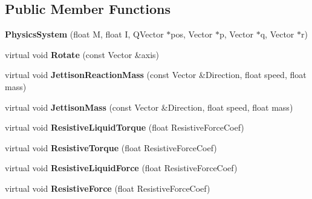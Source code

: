 \subsection*{Public Member Functions}
\begin{DoxyCompactItemize}
\item 
{\bfseries Physics\+System} (float M, float I, Q\+Vector $\ast$pos, Vector $\ast$p, Vector $\ast$q, Vector $\ast$r)\hypertarget{classPhysicsSystem_a30fd3a9343a9bd9a004bcd3f9c8bfa40}{}\label{classPhysicsSystem_a30fd3a9343a9bd9a004bcd3f9c8bfa40}

\item 
virtual void {\bfseries Rotate} (const Vector \&axis)\hypertarget{classPhysicsSystem_aeb8fb2743397f3682b459f891a4d7d2c}{}\label{classPhysicsSystem_aeb8fb2743397f3682b459f891a4d7d2c}

\item 
virtual void {\bfseries Jettison\+Reaction\+Mass} (const Vector \&Direction, float speed, float mass)\hypertarget{classPhysicsSystem_ac5a9beb8c8d90f8fc06585cdcaebd63b}{}\label{classPhysicsSystem_ac5a9beb8c8d90f8fc06585cdcaebd63b}

\item 
virtual void {\bfseries Jettison\+Mass} (const Vector \&Direction, float speed, float mass)\hypertarget{classPhysicsSystem_a464c1a58ce4248cbf3b56b7d1c76bcdf}{}\label{classPhysicsSystem_a464c1a58ce4248cbf3b56b7d1c76bcdf}

\item 
virtual void {\bfseries Resistive\+Liquid\+Torque} (float Resistive\+Force\+Coef)\hypertarget{classPhysicsSystem_a1c534b6f4a5e0d5e6543845391d3123d}{}\label{classPhysicsSystem_a1c534b6f4a5e0d5e6543845391d3123d}

\item 
virtual void {\bfseries Resistive\+Torque} (float Resistive\+Force\+Coef)\hypertarget{classPhysicsSystem_a37727d3bf65ad645149d710da19adfb0}{}\label{classPhysicsSystem_a37727d3bf65ad645149d710da19adfb0}

\item 
virtual void {\bfseries Resistive\+Liquid\+Force} (float Resistive\+Force\+Coef)\hypertarget{classPhysicsSystem_ac9c5dfec81a1fb6d5fbd615fdba727ff}{}\label{classPhysicsSystem_ac9c5dfec81a1fb6d5fbd615fdba727ff}

\item 
virtual void {\bfseries Resistive\+Force} (float Resistive\+Force\+Coef)\hypertarget{classPhysicsSystem_a2f55315c9c70f52deb4aac8f79654594}{}\label{classPhysicsSystem_a2f55315c9c70f52deb4aac8f79654594}


\end{DoxyCompactItemize}
